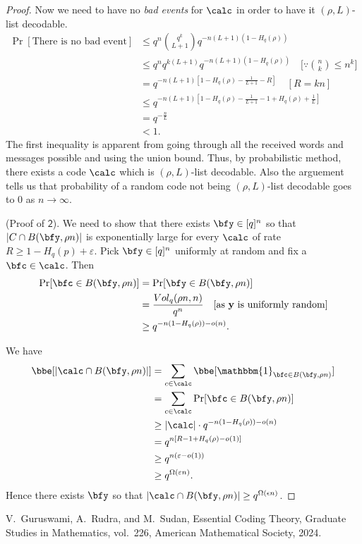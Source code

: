 \begin{proof}
		Now we need to have no \emph{bad events} for $\calc$ in order to have it $(\rho, L)$-list decodable.
		\begin{align*}
			\Pr[\text{There is no bad event}]
			& \leq q^n\binom{q^k}{L+1}q^{-n(L+1)(1 - H_q(\rho))} \\
			& \leq q^n q^{k(L+1)} q^{-n(L+1)(1 - H_q(\rho))} \quad \text{[$\because \binom{n}{k} \leq n^k$]}\\ 
			& = q^{-n(L+1)[1 - H_q(\rho) - \frac{1}{L+1} - R]} \quad [R = kn] \\
			& \leq q^{-n(L+1)[1 - H_q(\rho) -\frac{1}{L+1} -1 + H_q(\rho) + \frac{1}{L}]} \\
			& = q^{-\frac{n}{L}} \\
			& < 1.
		\end{align*}
		The first inequality is apparent from going through all the received words and messages possible and using the union bound. Thus, by probabilistic method, there exists a code $\calc$ which is $(\rho, L)$-list decodable. Also the arguement tells us that probability of a random code not being $(\rho, L)$-list decodable goes to 0 as $n\to\infty$. \newline
		
	\noindent \textsf{(Proof of $\mathsf{2}$).} We need to show that there exists $\bfy\in[q]^n$ so that $|C\cap B(\bfy,\rho n)|$ is exponentially large for every $\calc$ of rate $R\geq1-H_q(p)+\varepsilon$. Pick $\bfy\in[q]^n$ uniformly at random and fix a $\bfc\in\calc$. Then
	\begin{align*}
	\Pr[\bfc\in B(\bfy,\rho n)] 
	& = \Pr[\bfy\in B(\bfy, \rho n)]\\
	& = \frac{Vol_q(\rho n,n)}{q^n} \quad \text{[as $\mathbf{y}$ is uniformly random]}\\
	& \geq q^{-n(1-H_q(\rho)) - o(n)}.\\
	\end{align*}
	
We have 
\begin{align*}
	\bbe[|\calc\cap B(\bfy, \rho n)|] 
	& = \sum_{c\in\calc}\bbe[\mathbbm{1}_{\bfc\in B(\bfy,\rho n)}]\\
	& = \sum_{c\in\calc}\Pr[\bfc\in B(\bfy,\rho n)] \\
	& \geq |\calc| \cdot q^{-n(1-H_q(\rho)) - o(n)}\\
	& = q^{n[R-1+H_q(\rho) - o(1)]}\\
	& \geq q^{n(\varepsilon -  o(1))}\\
	& \geq q^{\Omega(\varepsilon n)}.
\end{align*}
Hence there exists $\bfy$ so that $|\calc\cap B(\bfy, \rho n)|\geq q^{\Omega(\epsilon n)}$.
	\end{proof}
	
	
	\newpage
	
	\begin{thebibliography}{}
		
		V.~Guruswami, A.~Rudra, and M.~Sudan, \textsf{Essential Coding Theory}, 
		Graduate Studies in Mathematics, vol.~226, American Mathematical Society, 2024.
	\end{thebibliography}
	
	
	

